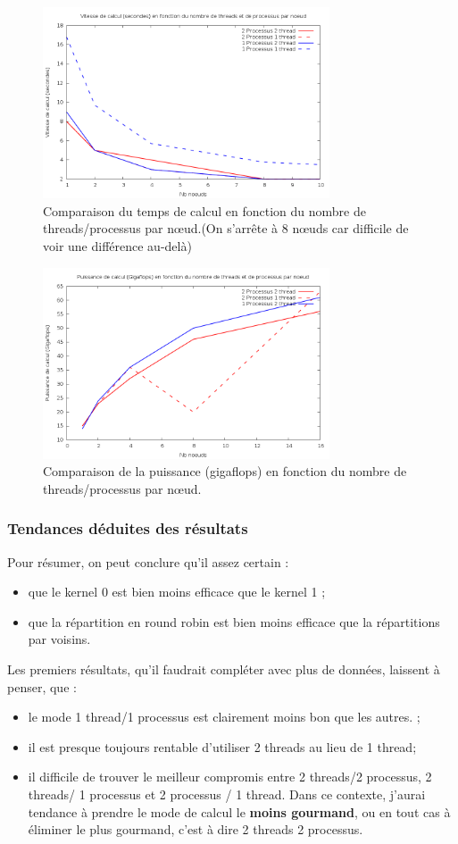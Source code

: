\documentclass[	DIV=calc,%
							paper=a4,%
							fontsize=11pt,%
							twocolumn]{scrartcl}	 					%
\begin{document}
\begin{figure}
\includegraphics[keepaspectratio,width=8.5cm]{img/speed.png} 
\caption{Comparaison du temps de calcul en fonction du nombre de threads/processus par nœud.(On s'arrête à 8 nœuds car difficile de voir une différence au-delà)}
\label{fig:speed}
\end{figure}

\begin{figure}
\includegraphics[keepaspectratio,width=8.5cm]{img/power.png} 
\caption{Comparaison de la puissance (gigaflops) en fonction du nombre de threads/processus par nœud.}
\label{fig:power}
\end{figure}

\subsubsection*{Tendances déduites des résultats}
Pour résumer, on peut conclure qu'il assez certain : 
\begin{itemize}
\item que le kernel 0 est bien moins efficace que le kernel 1 ;
\item que la répartition en round robin est bien moins efficace que la répartitions par voisins.
\end{itemize}
Les premiers résultats, qu'il faudrait compléter avec plus de données, laissent à penser, que : 
\begin{itemize}
\item le mode 1 thread/1 processus est clairement moins bon que les autres. ;
\item il est presque toujours rentable d'utiliser 2 threads au lieu de 1 thread;
\item il difficile de trouver le meilleur compromis entre 2 threads/2 processus, 2 threads/ 1 processus et 2 processus / 1 thread. Dans ce contexte, j'aurai tendance à prendre le mode de calcul le \textbf{moins gourmand}, ou en tout cas à éliminer le plus gourmand, c'est à dire 2 threads 2 processus.
\end{itemize}
\end{document}
